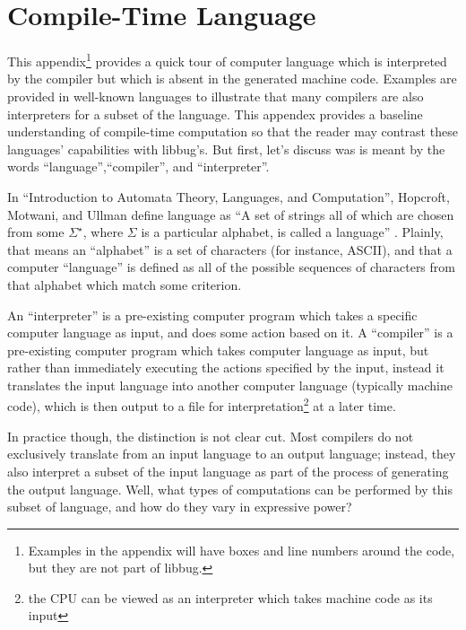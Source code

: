 
\appendix
 \appendixpage
 \noappendicestocpagenum
 \chapter{Compile-Time Language}
  \label{sec:appendix1}
 This appendix\footnote{Examples in the appendix will have boxes
 and line numbers around the code, but they are not part of libbug.}
 provides a quick tour of computer language which is interpreted
 by the compiler but which is absent in the generated machine
 code.  Examples are provided in
 well-known languages to illustrate that
 many compilers are also interpreters for a subset of the language.  This
 appendex provides a baseline understanding of compile-time computation
 so that the reader may contrast these languages' capabilities with libbug's.
 But first, let's discuss was is meant by the words ``language'',``compiler'', and
 ``interpreter''.

 In ``Introduction to Automata Theory, Languages, and Computation'', Hopcroft,
 Motwani, and Ullman define language as ``A set of strings all of which are chosen
 from some $\Sigma^{\star}$, where $\Sigma$ is a particular alphabet, is called
 a language'' \cite[p. 30]{hmu2001}.
 Plainly, that means an ``alphabet'' is a set of characters (for instance, ASCII), and
 that a computer ``language'' is defined as all of the possible sequences of characters
 from that alphabet which match some criterion.

 An ``interpreter'' is a pre-existing computer program which takes a specific
 computer language as input,
 and does some action based on it.  A ``compiler'' is a pre-existing computer program
 which takes computer language as input,
 but rather than immediately executing the actions specified by the input, instead it
 translates the input language
 into another computer language (typically machine code), which is then output to a file
 for interpretation\footnote{the CPU can be viewed as an
 interpreter which takes machine code as its input} at a later time.

 In practice though, the distinction is not clear cut.  Most compilers do not exclusively
 translate from an input language
 to an output language; instead, they also interpret a subset of the input
 language as part of the process of generating the output language.  Well, what
 types of computations can be performed by this subset of language, and how do
 they vary in expressive power?

